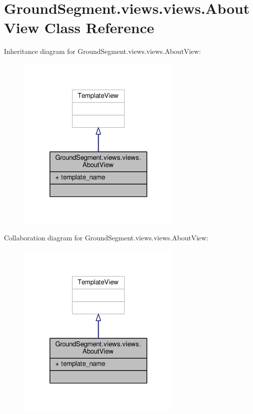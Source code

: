 \hypertarget{class_ground_segment_1_1views_1_1views_1_1_about_view}{}\section{Ground\+Segment.\+views.\+views.\+About\+View Class Reference}
\label{class_ground_segment_1_1views_1_1views_1_1_about_view}


Inheritance diagram for Ground\+Segment.\+views.\+views.\+About\+View\+:\nopagebreak
\begin{figure}[H]
\begin{center}
\leavevmode
\includegraphics[width=227pt]{class_ground_segment_1_1views_1_1views_1_1_about_view__inherit__graph}
\end{center}
\end{figure}


Collaboration diagram for Ground\+Segment.\+views.\+views.\+About\+View\+:\nopagebreak
\begin{figure}[H]
\begin{center}
\leavevmode
\includegraphics[width=227pt]{class_ground_segment_1_1views_1_1views_1_1_about_view__coll__graph}
\end{center}
\end{figure}
